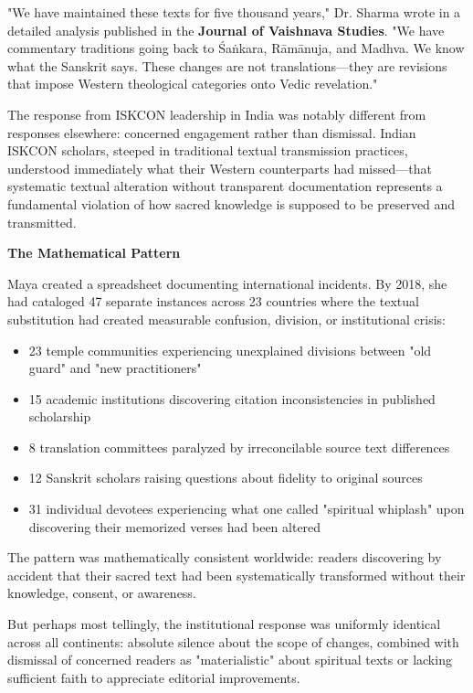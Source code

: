 \documentclass[12pt,twoside]{book}
\begin{document}
"We have maintained these texts for five thousand years," Dr. Sharma wrote in a detailed analysis published in the \textbf{Journal of Vaishnava Studies}. "We have commentary traditions going back to Śaṅkara, Rāmānuja, and Madhva. We know what the Sanskrit says. These changes are not translations—they are revisions that impose Western theological categories onto Vedic revelation."

The response from ISKCON leadership in India was notably different from responses elsewhere: concerned engagement rather than dismissal. Indian ISKCON scholars, steeped in traditional textual transmission practices, understood immediately what their Western counterparts had missed—that systematic textual alteration without transparent documentation represents a fundamental violation of how sacred knowledge is supposed to be preserved and transmitted.

\textbf{\textbf{The Mathematical Pattern}}

Maya created a spreadsheet documenting international incidents. By 2018, she had cataloged 47 separate instances across 23 countries where the textual substitution had created measurable confusion, division, or institutional crisis:

\begin{itemize}
\item 23 temple communities experiencing unexplained divisions between "old guard" and "new practitioners"
\item 15 academic institutions discovering citation inconsistencies in published scholarship
\item 8 translation committees paralyzed by irreconcilable source text differences
\item 12 Sanskrit scholars raising questions about fidelity to original sources
\item 31 individual devotees experiencing what one called "spiritual whiplash" upon discovering their memorized verses had been altered
\end{itemize}

The pattern was mathematically consistent worldwide: readers discovering by accident that their sacred text had been systematically transformed without their knowledge, consent, or awareness.

But perhaps most tellingly, the institutional response was uniformly identical across all continents: absolute silence about the scope of changes, combined with dismissal of concerned readers as "materialistic" about spiritual texts or lacking sufficient faith to appreciate editorial improvements.
\end{document}
